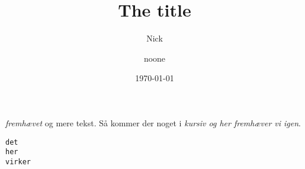

\title{The title}

\author{Nick \and noone}
\date{\today}


\maketitle
\emph{fremhævet} og mere tekst.
Så kommer der noget i \textit{kursiv
og her \emph{fremhæver} vi igen}.

\begin{alltt}
det 
	her
		virker
\end{alltt}

